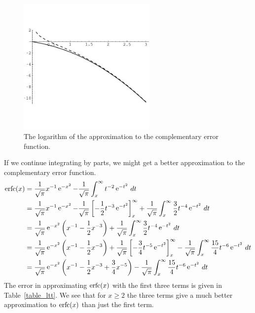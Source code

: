\begin{Example}
  \begin{figure}[h!]
    \begin{center}
      \includegraphics[width=0.6\textwidth]{ode/asymptotic/log_ft}
    \end{center}
    \caption{The logarithm of the approximation to the complementary error 
      function.}
    \label{log_first_term}
  \end{figure}




  If we continue integrating by parts, we might get a better approximation 
  to the complementary error function.
  \begin{align*}
    \mathop{\mathrm{erfc}}\nolimits(x)
    &= \frac{1}{\sqrt{\pi}}x^{-1} \mathop{\mathrm{e}}\nolimits^{-x^2} - 
    \frac{1}{\sqrt{\pi}}\int_x^\infty
    t^{-2} \mathop{\mathrm{e}}\nolimits^{-t^2}\,dt \\
    &= \frac{1}{\sqrt{\pi}}x^{-1} \mathop{\mathrm{e}}\nolimits^{-x^2} - 
    \frac{1}{\sqrt{\pi}}\left[-\frac{1}{2}t^{-3}\mathop{\mathrm{e}}\nolimits^{-t^2}
    \right]_x^\infty
    + \frac{1}{\sqrt{\pi}}\int_x^\infty
    \frac{3}{2}t^{-4} \mathop{\mathrm{e}}\nolimits^{-t^2}\,dt \\
    &= \frac{1}{\sqrt{\pi}}\mathop{\mathrm{e}}\nolimits^{-x^2}\left(x^{-1} 
      - \frac{1}{2}x^{-3}\right)
    + \frac{1}{\sqrt{\pi}}\int_x^\infty
    \frac{3}{2}t^{-4} \mathop{\mathrm{e}}\nolimits^{-t^2}\,dt \\
    &= \frac{1}{\sqrt{\pi}}\mathop{\mathrm{e}}\nolimits^{-x^2}\left(x^{-1} 
      - \frac{1}{2}x^{-3}\right)
    + \frac{1}{\sqrt{\pi}}\left[-\frac{3}{4}t^{-5}\mathop{\mathrm{e}}\nolimits^{-t^2}
    \right]_x^\infty
    - \frac{1}{\sqrt{\pi}}\int_x^\infty
    \frac{15}{4}t^{-6} \mathop{\mathrm{e}}\nolimits^{-t^2}\,dt \\
    &= \frac{1}{\sqrt{\pi}}\mathop{\mathrm{e}}\nolimits^{-x^2}\left(x^{-1} 
      - \frac{1}{2}x^{-3} + \frac{3}{4}x^{-5}\right)
    - \frac{1}{\sqrt{\pi}}\int_x^\infty
    \frac{15}{4}t^{-6} \mathop{\mathrm{e}}\nolimits^{-t^2}\,dt 
  \end{align*}
  The error in approximating $\mathop{\mathrm{erfc}}\nolimits(x)$ with the first three terms is
  given in Table~\ref{table_ltt}.
  We see that for $x \geq 2$ the three terms give a much better approximation
  to $\mathop{\mathrm{erfc}}\nolimits(x)$ than just the first term.


\end{Example}
